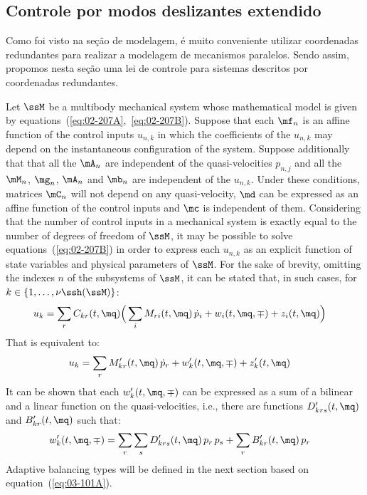 \subsection{Controle por modos deslizantes extendido}\label{S02-4}

Como foi visto na se\c{c}\~ao de modelagem, \'e muito conveniente utilizar coordenadas redundantes para realizar a modelagem de mecanismos paralelos. Sendo assim, propomos nesta se\c{c}\~ao uma lei de controle para sistemas descritos por coordenadas redundantes.

Let $\ssM$ be a multibody mechanical system whose mathematical model is given 
by equations~(\ref{eq:02-207A},~\ref{eq:02-207B}).
Suppose that each $\mf_{n}$ is an affine function of the control inputs $u_{n,k}$
in which the coefficients of the $u_{n,k}$ may depend on the instantaneous
configuration of the system.
Suppose additionally that that all the $\mA_{n}$ are independent
of the quasi-velocities $p_{n,j}$ and all the $\mM_{n}$, $\mg_{n}$, $\mA_{n}$ and $\mb_{n}$ 
are independent of the $u_{n,k}$.
Under these conditions, matrices $\mC_{n}$ will not depend on 
any quasi-velocity, $\md$ can be expressed as an affine function of the control inputs 
and $\mc$ is independent of them.
Considering that the number of control inputs in a mechanical system is
exactly equal to the number of degrees of freedom of $\ssM$, 
it may be possible to solve equations~(\ref{eq:02-207B}) in order to
express each $u_{n,k}$ as an explicit function of state variables and
physical parameters of $\ssM$.
For the sake of brevity, omitting the indexes $n$ of the subsystems of $\ssM$,
it can be stated that, in such cases, for $k \in \{ 1,\ldots,\nu\ssh(\ssM) \}$:
\begin{align}
&	u_{k} = \sum_{r} C_{kr} (t,\mq) \Big(  \sum_{i} M_{ri}(t,\mq) \, \dot p_i 
		+ w_{i}(t, \mq, \mp)
		+ z_{i}(t, \mq) \Big)
	\label{eq:03-101Especial} 
\end{align}
That is equivalent to:
\begin{align}
&	u_{k} = \sum_{r} M'_{kr}(t,\mq) \, \dot p_r 
		+ w'_{k}(t, \mq, \mp)
		+ z'_{k}(t, \mq)
	\label{eq:03-101A} 
\end{align}
It can be shown that each $w'_{k}(t, \mq, \mp)$ can be expressed as a sum of 
a bilinear and a linear function on the quasi-velocities, i.e., there are functions
$D'_{krs}(t,\mq)$ and $B'_{kr}(t,\mq)$ such that:
\begin{align}	
&	w'_{k}(t, \mq, \mp) = \sum_{r} \sum_{s} D'_{krs}(t,\mq) \, p_r \, p_s
		+ \sum_{r} B'_{kr}(t,\mq) \, p_r
	\label{eq:03-101B}	
\end{align}
Adaptive balancing types will be defined in the next section based on equation~(\ref{eq:03-101A}).

